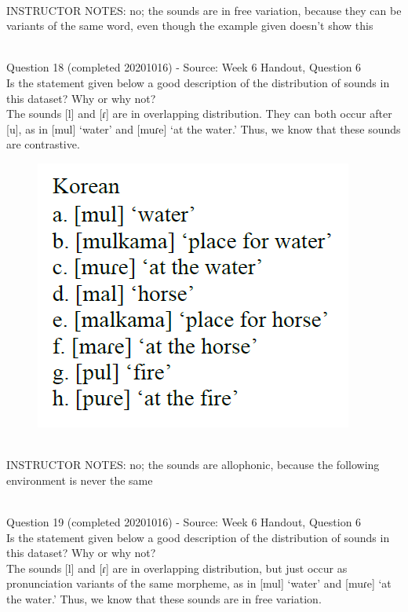 \documentclass[12pt]{article}
\begin{document}
~\\
INSTRUCTOR NOTES: no; the sounds are in free variation, because they can be variants of the same word, even though the example given doesn't show this


~\\

{\large Question 18} (completed 20201016) - Source: Week 6 Handout, Question 6\\

Is the statement given below a good description of the distribution of sounds in this dataset? Why or why not?\\

The sounds {[l]} and {[ɾ]} are in overlapping distribution. They can both occur after {[u]}, as in {[mul]} ‘water’ and {[muɾe]} ‘at the water.’ Thus, we know that these sounds are contrastive.

\begin{figure}[H]
\includegraphics{../images/korean.png}
\end{figure}

~\\
INSTRUCTOR NOTES: no; the sounds are allophonic, because the following environment is never the same


~\\

{\large Question 19} (completed 20201016) - Source: Week 6 Handout, Question 6\\

Is the statement given below a good description of the distribution of sounds in this dataset? Why or why not?\\

The sounds {[l]} and {[ɾ]} are in overlapping distribution, but just occur as pronunciation variants of the same morpheme, as in {[mul]} ‘water’ and {[muɾe]} ‘at the water.’ Thus, we know that these sounds are in free variation.
\end{document}
